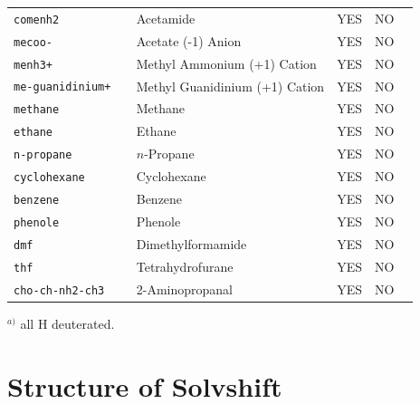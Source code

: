 \documentclass[a4paper,titlepage,twoside,fleqn,12pt]{book}
\begin{document}
\begin{refsection}
\begin{table}[t!]
\begin{tabular*}{1.0\textwidth}{@{\extracolsep{\fill} } lllll}
 \tt{comenh2         } & Acetamide                       & YES  &   NO     &                                          \\
 \tt{mecoo-          } & Acetate (-1) Anion              & YES  &   NO     &                                          \\
 \tt{menh3+          } & Methyl Ammonium (+1) Cation     & YES  &   NO     &                                          \\
 \tt{me-guanidinium+ } & Methyl Guanidinium (+1) Cation  & YES  &   NO     &                                          \\
 \tt{methane         } & Methane                         & YES  &   NO     &                                          \\
 \tt{ethane          } & Ethane                          & YES  &   NO     &                                          \\
 \tt{n-propane       } & $n$-Propane                     & YES  &   NO     &                                          \\
 \tt{cyclohexane     } & Cyclohexane                     & YES  &   NO     &                                          \\
 \tt{benzene         } & Benzene                         & YES  &   NO     &                                          \\
 \tt{phenole         } & Phenole                         & YES  &   NO     &                                          \\
 \tt{dmf             } & Dimethylformamide               & YES  &   NO     &                                          \\
 \tt{thf             } & Tetrahydrofurane                & YES  &   NO     &                                          \\
 \tt{cho-ch-nh2-ch3  } & 2-Aminopropanal                 & YES  &   NO     &                                          \\
\hline\hline
\end{tabular*}
%
\begin{footnotesize}
$^{a)}$ all H deuterated.
\end{footnotesize}
\end{table}
%



\section{Structure of Solvshift}


\end{refsection}
\end{document}
